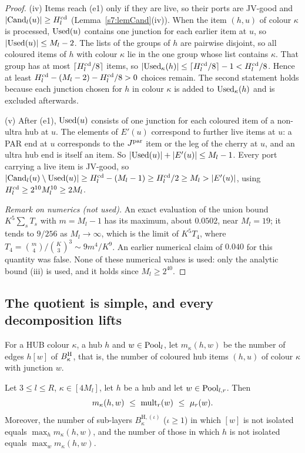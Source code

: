 \begin{proof}
(iv) Items reach (e1) only if they are live, so their ports are JV-good and
$|\mathrm{Cand}_l(u)|\ge H^{\mathrm{cd}}_l$ (Lemma~\ref{s7:lemCand}(iv)). When the item $(h,u)$ of
colour $\kappa$ is processed, $\mathrm{Used}(u)$ contains one junction for each earlier
item at $u$, so $|\mathrm{Used}(u)|\le M_l-2$. The lists of the groups of $h$ are pairwise
disjoint, so all coloured items of $h$ with colour $\kappa$ lie in the one group
whose list contains $\kappa$. That group has at most $\lceil H^{\mathrm{cd}}_l/8\rceil$
items, so $|\mathrm{Used}_\kappa(h)|\le\lceil H^{\mathrm{cd}}_l/8\rceil-1<H^{\mathrm{cd}}_l/8$. Hence at least
$H^{\mathrm{cd}}_l-(M_l-2)-H^{\mathrm{cd}}_l/8>0$ choices remain. The second statement holds because
each junction chosen for $h$ in colour $\kappa$ is added to $\mathrm{Used}_\kappa(h)$
and is excluded afterwards.

(v) After (e1), $\mathrm{Used}(u)$ consists of one junction for each coloured item of a
non-ultra hub at $u$. The elements of $E'(u)$ correspond to further live items at
$u$: a PAR end at $u$ corresponds to the $J^{\mathrm{par}}$ item or the leg of the cherry at
$u$, and an ultra hub end is itself an item. So
$|\mathrm{Used}(u)|+|E'(u)|\le M_l-1$. Every port carrying a live item is JV-good, so
$|\mathrm{Cand}_l(u)\setminus\mathrm{Used}(u)|\ge H^{\mathrm{cd}}_l-(M_l-1)\ge H^{\mathrm{cd}}_l/2\ge M_l>|E'(u)|$,
using $H^{\mathrm{cd}}_l\ge2^{10}M_l^{10}\ge2M_l$.

\emph{Remark on numerics (not used).} An exact evaluation of the union bound
$K^5\sum_sT_s$ with $m=M_l-1$ has its maximum, about $0.0502$, near $M_l=19$;
it tends to $9/256$ as $M_l\to\infty$, which is the limit of $K^5T_4$, where
$T_4=\binom{m}{4}/\binom{K}{3}^3\sim9m^4/K^9$. An earlier numerical claim of $0.040$ for this quantity was
false. None of these numerical values is used: only the analytic bound (iii) is
used, and it holds since $M_l\ge2^{40}$.
\end{proof}

\subsection{The quotient is simple, and every decomposition lifts}

For a HUB colour $\kappa$, a hub $h$ and $w\in\mathrm{Pool}_l$, let $m_\kappa(h,w)$ be
the number of edges $h[w]$ of $B^{\mathrm{H}}_\kappa$, that is, the number of coloured hub
items $(h,u)$ of colour $\kappa$ with junction $w$.

\begin{lemma}\label{s7:lemMULT}
Let $3\le l\le R$, $\kappa\in[4M_l]$, let $h$ be a hub and let
$w\in\mathrm{Pool}_{l,r}$. Then
\[
m_\kappa(h,w)\ \le\ \mult_r(w)\ \le\ \mu_r(w).
\]
Moreover, the number of sub-layers $B^{\mathrm{H},(\iota)}_\kappa$ ($\iota\ge1$)
in which $[w]$ is not isolated equals $\max_{h}m_\kappa(h,w)$, and the number of
those in which $h$ is not isolated equals $\max_{w}m_\kappa(h,w)$.
\deps{\ref{s7:consRound}, \ref{s6:lemJplus}, \ref{s7:defCand}, \ref{s7:defPool}, \ref{s2:propOV}}
\end{lemma}

